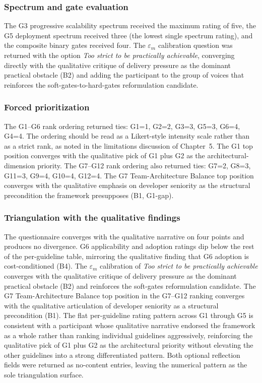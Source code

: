 \subsubsection*{Spectrum and gate evaluation}

The G3 progressive scalability spectrum received the maximum rating of five, the G5 deployment spectrum received three (the lowest single spectrum rating), and the composite binary gates received four. The $\varepsilon_m$ calibration question was returned with the option \emph{Too strict to be practically achievable}, converging directly with the qualitative critique of delivery pressure as the dominant practical obstacle (B2) and adding the participant to the group of voices that reinforces the soft-gates-to-hard-gates reformulation candidate.

\subsubsection*{Forced prioritization}

The G1--G6 rank ordering returned ties: G1=1, G2=2, G3=3, G5=3, G6=4, G4=4. The ordering should be read as a Likert-style intensity scale rather than as a strict rank, as noted in the limitations discussion of Chapter~5. The G1 top position converges with the qualitative pick of G1 plus G2 as the architectural-dimension priority. The G7--G12 rank ordering also returned ties: G7=2, G8=3, G11=3, G9=4, G10=4, G12=4. The G7 Team-Architecture Balance top position converges with the qualitative emphasis on developer seniority as the structural precondition the framework presupposes (B1, G1-gap).

\subsubsection*{Triangulation with the qualitative findings}

The questionnaire converges with the qualitative narrative on four points and produces no divergence. G6 applicability and adoption ratings dip below the rest of the per-guideline table, mirroring the qualitative finding that G6 adoption is cost-conditioned (B4). The $\varepsilon_m$ calibration of \emph{Too strict to be practically achievable} converges with the qualitative critique of delivery pressure as the dominant practical obstacle (B2) and reinforces the soft-gates reformulation candidate. The G7 Team-Architecture Balance top position in the G7--G12 ranking converges with the qualitative articulation of developer seniority as a structural precondition (B1). The flat per-guideline rating pattern across G1 through G5 is consistent with a participant whose qualitative narrative endorsed the framework as a whole rather than ranking individual guidelines aggressively, reinforcing the qualitative pick of G1 plus G2 as the architectural priority without elevating the other guidelines into a strong differentiated pattern. Both optional reflection fields were returned as no-content entries, leaving the numerical pattern as the sole triangulation surface.

